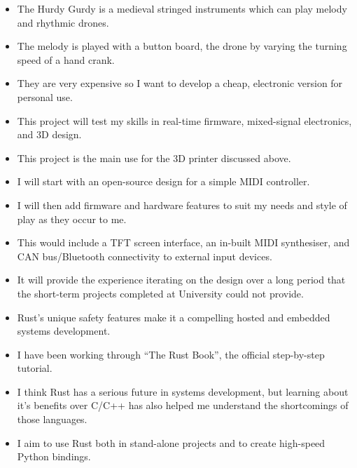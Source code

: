 {
  {\begin{itemize}
    \item The Hurdy Gurdy is a medieval stringed instruments which can play melody and rhythmic drones.
    \item The melody is played with a button board, the drone by varying the turning speed of a hand crank.  
    \item They are very expensive so I want to develop a cheap, electronic version for personal use.
    \item This project will test my skills in real-time firmware, mixed-signal electronics, and 3D design. 
    \item This project is the main use for the 3D printer discussed above.
    \item I will start with an open-source design for a simple MIDI controller.
    \item I will then add firmware and hardware features to suit my needs and style of play as they occur to me. 
    \item This would include a TFT screen interface, an in-built MIDI synthesiser, and CAN bus/Bluetooth connectivity to external input devices.
    \item It will provide the experience iterating on the design over a long period that the short-term projects completed at University could not provide.
  \end{itemize}
  }
}

{
  {\begin{itemize}
    \item Rust's unique safety features make it a compelling hosted and embedded systems development.
    \item I have been working through ``The Rust Book'', the official step-by-step tutorial.
    \item I think Rust has a serious future in systems development, but learning about it's benefits over C/C++ has also helped me understand the shortcomings of those languages.
    \item I aim to use Rust both in stand-alone projects and to create high-speed Python bindings. 
  \end{itemize}
  }
}

